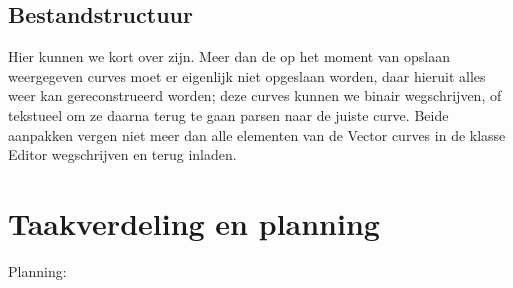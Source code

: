 \documentclass[a4paper,11pt,oneside, titlepage]{article}
\begin{document}
\subsection{Bestandstructuur}
Hier kunnen we kort over zijn. Meer dan de op het moment van opslaan weergegeven curves moet er eigenlijk niet opgeslaan worden, daar hieruit alles weer kan gereconstrueerd worden; deze curves kunnen we binair wegschrijven, of tekstueel om ze daarna terug te gaan parsen naar de juiste curve. Beide aanpakken vergen niet meer dan alle elementen van de Vector curves in de klasse Editor wegschrijven en terug inladen.

\section{Taakverdeling en planning}
Planning: 
\end{document}
